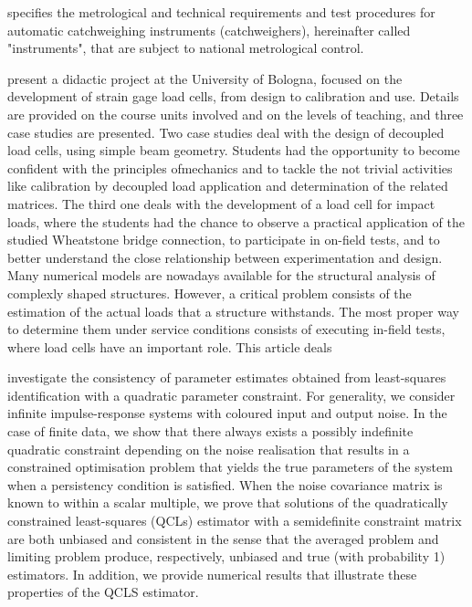 \documentclass[11pt]{article}
\begin{document}
\citet{OIML_R51_1} specifies  the  metrological  and  technical  requirements  and  test  procedures for automatic catchweighing instruments (catchweighers), hereinafter called "instruments", that are subject to national metrological control. 

\citet{Olmi16} present a didactic project at the University of Bologna, focused on the development of strain gage load cells, from design to calibration and use. Details are provided on the course units involved and on the levels of teaching, and three case studies are presented. Two case studies deal with the design of decoupled load cells, using simple beam geometry. Students had the opportunity to become confident with the principles ofmechanics and to tackle the not trivial activities like calibration by decoupled load application and determination of the related matrices. The third one deals with the development of a load cell for impact loads, where the students had the chance to observe a practical application of the studied Wheatstone bridge connection, to participate in on-field tests, and to better understand the close relationship between experimentation and design.
Many numerical models are nowadays available for the structural analysis of complexly shaped structures. However, a critical problem consists of the estimation of the actual loads that a structure withstands. The most proper way to determine them under service conditions consists of executing in-field tests, where load cells have an important role. This article deals

\citet{Palanthandalam10parameter}  investigate the consistency of parameter estimates obtained from least-squares identification with a quadratic parameter constraint. For generality, we consider infinite impulse-response systems with coloured input and output noise. In the case of finite data, we show that there always exists a possibly indefinite quadratic constraint depending on the noise realisation that results in a constrained optimisation problem that yields the true parameters of the system when a persistency condition is satisfied. When the noise covariance matrix is known to within a scalar multiple, we prove that solutions of the quadratically constrained least-squares (QCLs) estimator with a semidefinite constraint matrix are both unbiased and consistent in the sense that the averaged problem and limiting problem produce, respectively, unbiased and true (with probability 1) estimators. In addition, we provide numerical results that illustrate these properties of the QCLS estimator.
\end{document}
